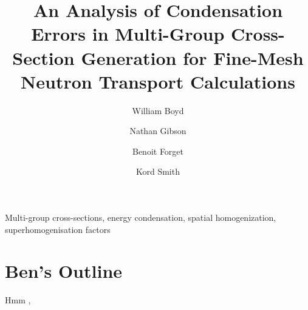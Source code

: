 \documentclass[authoryear,5p]{elsarticle}
\begin{document}
\begin{frontmatter}

\title{An Analysis of Condensation Errors in Multi-Group Cross-Section Generation for Fine-Mesh Neutron Transport Calculations}

\author{William Boyd}

\author{Nathan Gibson\corref{}}

\author{Benoit Forget\corref{}}

\author{Kord Smith\corref{}}

\address{Massachusetts Institute of Technology, Department of Nuclear Science and Engineering, 77 Massachusetts Avenue, Building 24, Cambridge, MA 02139, United States\vspace{-8ex}}


\begin{abstract}

\end{abstract}

\begin{keyword}
Multi-group cross-sections, energy condensation, spatial homogenization, superhomogenisation factors
\end{keyword}

\end{frontmatter}


\section*{Ben's Outline}

Hmm \cite{askew1972moc} \cite{hebert2005ribon}, \cite{hebert1993consistent} \cite{hebert1997advances}
\end{document}
